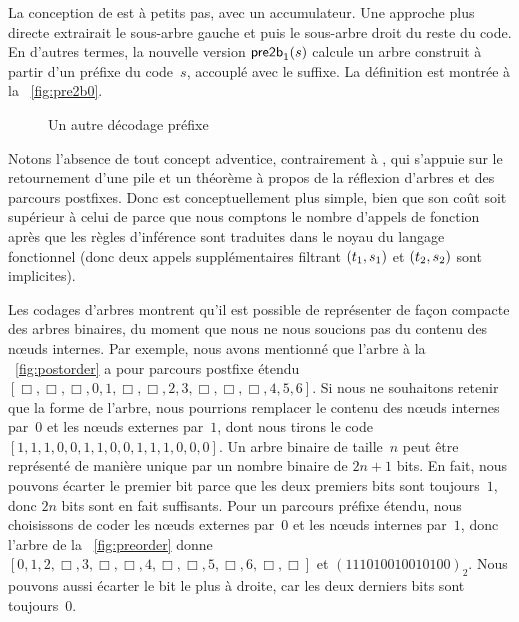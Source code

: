 La conception de  est à petits
pas, avec un accumulateur. Une approche plus directe extrairait le
sous-arbre gauche et puis le sous-arbre droit du reste du code. En
d'autres termes, la nouvelle version
\(\textsf{pre2b}_1(s)\) calcule un
arbre construit à partir d'un préfixe du code~\(s\), accouplé avec le
suffixe. La définition est montrée à la \fig~\vref{fig:pre2b0}.
\begin{figure}
\abovedisplayskip=0pt
\belowdisplayskip=0pt
\centering
{}
\caption{Un autre décodage préfixe}
\label{fig:pre2b0}
\end{figure}
Notons l'absence de tout concept adventice, contrairement à
, qui s'appuie sur le
retournement d'une pile et un théorème à
propos de la réflexion d'arbres et des parcours postfixes. Donc
 est
conceptuellement plus simple, bien que son coût soit supérieur à celui
de  parce que nous comptons le
nombre d'appels de fonction après que les règles
d'inférence sont traduites dans le noyau du
langage fonctionnel (donc deux appels supplémentaires filtrant
\(({t_1},{s_1})\) et \(({t_2},{s_2})\) sont implicites).

Les codages d'arbres montrent qu'il est possible de représenter de
façon compacte des arbres binaires, du moment que nous ne nous
soucions pas du contenu des nœuds internes. Par exemple, nous
avons mentionné que l'arbre à la \fig~\vref{fig:postorder} a pour
parcours postfixe étendu
\([\Box, \Box, \Box, 0, 1, \Box, \Box, 2, 3, \Box, \Box, \Box, 4, 5,
6]\). Si nous ne souhaitons retenir que la forme de l'arbre, nous
pourrions remplacer le contenu des nœuds internes par~\(0\) et les
nœuds externes par~\(1\), dont nous tirons le code
\([1,1,1,0,0,1,1,0,0,1,1,1,0,0,0]\). Un arbre binaire de taille~\(n\)
peut être représenté de manière unique par un nombre binaire de
\(2n+1\) bits. En fait, nous pouvons écarter le premier bit parce que
les deux premiers bits sont toujours~\(1\), donc \(2n\) bits sont en
fait suffisants. Pour un parcours préfixe étendu, nous choisissons de
coder les nœuds externes par~\(0\) et les nœuds internes
par~\(1\), donc l'arbre de la \fig~\vref{fig:preorder} donne \([0, 1,
2, \Box, 3, \Box, \Box, 4, \Box, \Box, 5, \Box, 6, \Box, \Box]\) et
\((111010010010100)_2\). Nous pouvons aussi écarter le bit le plus à
droite, car les deux derniers bits sont toujours~\(0\).

